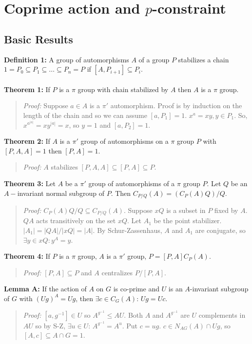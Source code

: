 \chapter{Coprime action and $p$-constraint}
\section {Basic Results}
{\bf Definition 1:} A group of automorphisms $A$ of a group $P$ stabilizes a chain
$1=P_0 \subseteq P_{1} \subseteq \ldots \subseteq P_n = P$ if
$[A,P_{i+1}] \subseteq P_{i}$.  \\
\\
{\bf Theorem 1:} If $P$ is a $\pi$ group with chain stabilized by
$A$ then $A$ is a $\pi$ group.
\begin{quote}
\emph{Proof:} Suppose $a \in A$ is a $\pi'$ automorphism.  Proof is by induction on the
length of the chain and so we can assume $[a,P_1]=1$.
$x^a =xy, y \in P_1$.  So, $x^{a^{|a|}}= x y^{|a|}=x$, so $y=1$ and
$[a,P_2]=1$.
\end{quote}
{\bf Theorem 2:} If $A$ is a $\pi'$ group of automorphisms on a $\pi$ group $P$ with
$[P,A,A]=1$ then $[P,A]=1$.
\begin{quote}
\emph{Proof:}  $A$ stabilizes
$[P,A,A] \subseteq [P,A] \subseteq P$.
\end{quote}
{\bf Theorem 3:}
Let $A$ be a $\pi'$ group of automorphisms of a $\pi$ group $P$.  Let $Q$ be
an $A-$invariant normal subgroup of $P$.  Then $C_{P/Q}(A)= (C_P(A) Q)/Q$.
\begin{quote}
\emph{Proof:}   $C_P(A)Q/Q \subseteq C_{P/Q}(A)$.  Suppose $xQ$ is a subset in $P$ fixed by
$A$.  $QA$ acts transitively on the set $xQ$.  Let $A_1$ be the point stabilizer.
$|A_1|=|QA|/|xQ|=|A|$.  By Schur-Zassenhaus, $A$ and $A_1$ are conjugate, so $\exists y \in xQ:
y^A=y$.
\end{quote}
{\bf Theorem 4:} If $P$ is a $\pi$ group, $A$ is a $\pi'$ group, $P= [P,A] C_P(A)$.
\begin{quote}
\emph{Proof:}
$[P,A] \subseteq P$ and $A$ centralizes $P/[P,A]$.
\end{quote}
{\bf Lemma A:} If the action of $A$ on $G$ is co-prime and $U$ is an $A$-invariant subgroup of $G$ with
$(Ug)^A=Ug$, then $\exists c \in C_G(A)$: $Ug = Uc$.
\begin{quote}
\emph{Proof:}  $[a, g^{-1}] \in U$ so $A^{g^{-1}} \leq AU$.  Both $A$ and $A^{g^{-1}}$ are $U$ complements in
$AU$ so by S-Z, $\exists u \in U$: $A^{g^{-1}} = A^u$.  Put $c= ug$.  $c \in N_{AG}(A) \cap Ug$, so
$[A,c] \subseteq A \cap G = 1$.
\end{quote}
